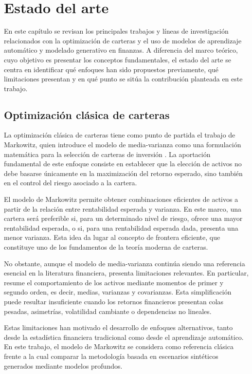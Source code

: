 \section{Estado del arte}

En este capítulo se revisan los principales trabajos y líneas de investigación relacionados con la optimización de carteras y el uso de modelos de aprendizaje automático y modelado generativo en finanzas. A diferencia del marco teórico, cuyo objetivo es presentar los conceptos fundamentales, el estado del arte se centra en identificar qué enfoques han sido propuestos previamente, qué limitaciones presentan y en qué punto se sitúa la contribución planteada en este trabajo.

\subsection{Optimización clásica de carteras}

La optimización clásica de carteras tiene como punto de partida el trabajo de Markowitz, quien introduce el modelo de media-varianza como una formulación matemática para la selección de carteras de inversión \cite{markowitz1952}. La aportación fundamental de este enfoque consiste en establecer que la elección de activos no debe basarse únicamente en la maximización del retorno esperado, sino también en el control del riesgo asociado a la cartera.

El modelo de Markowitz permite obtener combinaciones eficientes de activos a partir de la relación entre rentabilidad esperada y varianza. En este marco, una cartera será preferible si, para un determinado nivel de riesgo, ofrece una mayor rentabilidad esperada, o si, para una rentabilidad esperada dada, presenta una menor varianza. Esta idea da lugar al concepto de frontera eficiente, que constituye uno de los fundamentos de la teoría moderna de carteras.

No obstante, aunque el modelo de media-varianza continúa siendo una referencia esencial en la literatura financiera, presenta limitaciones relevantes. En particular, resume el comportamiento de los activos mediante momentos de primer y segundo orden, es decir, medias, varianzas y covarianzas. Esta simplificación puede resultar insuficiente cuando los retornos financieros presentan colas pesadas, asimetrías, volatilidad cambiante o dependencias no lineales.

Estas limitaciones han motivado el desarrollo de enfoques alternativos, tanto desde la estadística financiera tradicional como desde el aprendizaje automático. En este trabajo, el modelo de Markowitz se considera como referencia clásica frente a la cual comparar la metodología basada en escenarios sintéticos generados mediante modelos profundos.

